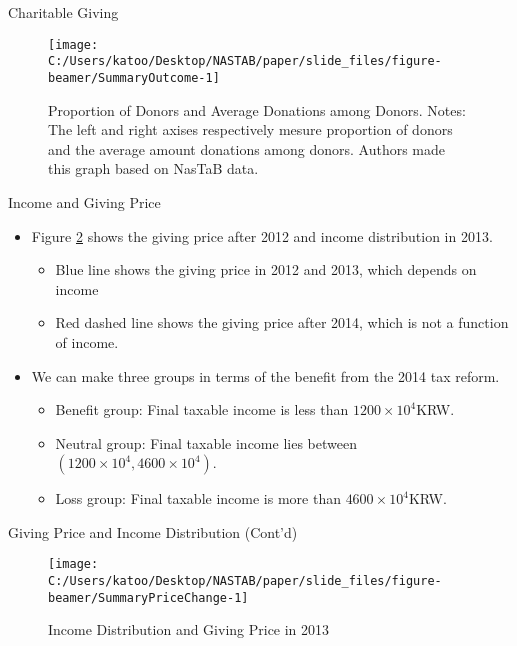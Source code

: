 \documentclass[
  ignorenonframetext,
  aspectratio=169]{beamer}
\providecommand{\tightlist}{%
  \setlength{\itemsep}{0pt}\setlength{\parskip}{0pt}}
\begin{document}
\begin{frame}{Charitable Giving}
\protect\hypertarget{charitable-giving}{}
\begin{figure}[t]

{\centering \texttt{[image: C:/Users/katoo/Desktop/NASTAB/paper/slide\_files/figure-beamer/SummaryOutcome-1]} 

}

\caption{Proportion of Donors and Average Donations among Donors. Notes: The left and right axises respectively mesure proportion of donors and the average amount donations among donors. Authors made this graph based on NasTaB data.}\label{fig:SummaryOutcome}
\end{figure}
\end{frame}

\begin{frame}{Income and Giving Price}
\protect\hypertarget{income-and-giving-price}{}
\begin{itemize}
\tightlist
\item
  Figure \ref{fig:SummaryPriceChange} shows the giving price after 2012 and income distribution in 2013.

  \begin{itemize}
  \tightlist
  \item
    Blue line shows the giving price in 2012 and 2013, which depends on income
  \item
    Red dashed line shows the giving price after 2014, which is not a function of income.
  \end{itemize}
\item
  We can make three groups in terms of the benefit from the 2014 tax reform.

  \begin{itemize}
  \tightlist
  \item
    Benefit group: Final taxable income is less than \(1200 \times 10^4\)KRW.
  \item
    Neutral group: Final taxable income lies between \((1200 \times 10^4, 4600 \times 10^4)\).
  \item
    Loss group: Final taxable income is more than \(4600 \times 10^4\)KRW.
  \end{itemize}
\end{itemize}
\end{frame}

\begin{frame}{Giving Price and Income Distribution (Cont'd)}
\protect\hypertarget{giving-price-and-income-distribution-contd}{}
\begin{figure}[t]

{\centering \texttt{[image: C:/Users/katoo/Desktop/NASTAB/paper/slide\_files/figure-beamer/SummaryPriceChange-1]} 

}

\caption{Income Distribution and Giving Price in 2013}\label{fig:SummaryPriceChange}
\end{figure}
\end{frame}
\end{document}
